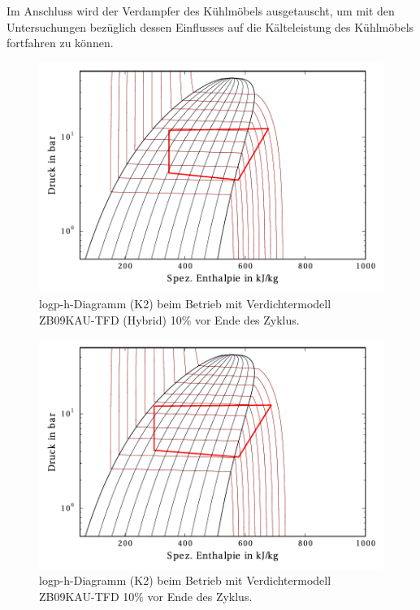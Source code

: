 Im Anschluss wird der Verdampfer des Kühlmöbels ausgetauscht, um mit den Untersuchungen bezüglich dessen Einflusses auf die Kälteleistung des Kühlmöbels fortfahren zu können. 




\begin{figure}[h!]
\centering
\includegraphics[scale=0.8]{Pictures/51/log_ph_lastCycle10perc_C21.pdf}
\caption{logp-h-Diagramm (K2) beim Betrieb mit Verdichtermodell ZB09KAU-TFD (Hybrid) \unit{10}{\%} vor Ende des Zyklus.}
\label{fig:logph51}
\end{figure}

\begin{figure}[h!]
\centering
\includegraphics[scale=0.8]{Pictures/54/log_ph_lastCycle10perc_C21.pdf}
\caption{logp-h-Diagramm (K2) beim Betrieb mit Verdichtermodell ZB09KAU-TFD \unit{10}{\%} vor Ende des Zyklus.}
\label{fig:logph54}
\end{figure}






